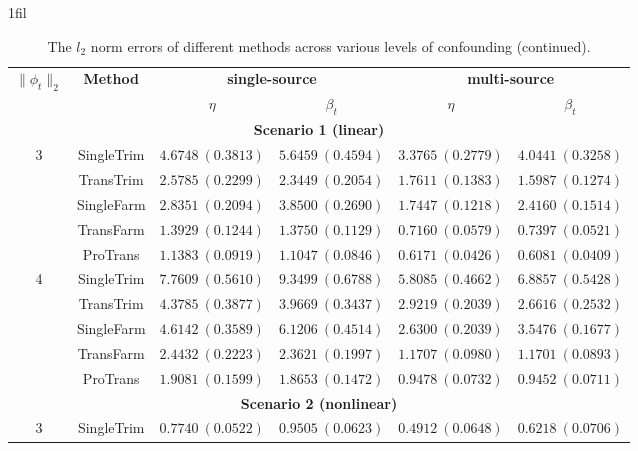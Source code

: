 \documentclass[12pt]{article}
\makeatletter
\newcommand*{\centerfloat}{%
  \parindent \z@
  \leftskip \z@ \@plus 1fil \@minus \marginparwidth
  \rightskip \leftskip
  \parfillskip \z@skip}
\makeatother
\begin{document}
\begin{table}[!ht]
\renewcommand{\arraystretch}{0.6}
\footnotesize
\centerfloat
\caption{The $l_2$ norm errors of different methods across various levels of confounding (continued).}
\label{tab:sup:l2_norm_phi(continued)}
    \begin{tabular}{cccccc}
        \toprule
        \multirow{2}{*}{$\|\phi_t\|_2$} & \multirow{2}{*}{\textbf{Method}} & \multicolumn{2}{c}{\textbf{single-source}} & \multicolumn{2}{c}{\textbf{multi-source}}\\
        \cmidrule(lr){3-4} \cmidrule(lr){5-6} 
        & & $\eta$ & $\beta_{t}$ & $\eta$& $\beta_{t}$ \\
        \midrule
        \multicolumn{6}{c}{\textbf{Scenario 1 (linear)}}\\
        \hline
        \multirow{5}{*}{3} 
        & SingleTrim  & $4.6748\ (0.3813)$ & $5.6459\ (0.4594)$ & $3.3765\ (0.2779)$ & $4.0441\ (0.3258)$ \\
        & TransTrim   & $2.5785\ (0.2299)$ & $2.3449\ (0.2054)$ & $1.7611\ (0.1383)$ & $1.5987\ (0.1274)$ \\
        & SingleFarm  & $2.8351\ (0.2094)$ & $3.8500\ (0.2690)$ & $1.7447\ (0.1218)$ & $2.4160\ (0.1514)$ \\
        & TransFarm   & $1.3929\ (0.1244)$ & $1.3750\ (0.1129)$ & $0.7160\ (0.0579)$ & $0.7397\ (0.0521)$ \\
        & ProTrans    & $\bm{1.1383}\ (0.0919)$ & $\bm{1.1047}\ (0.0846)$ & $\bm{0.6171}\ (0.0426)$ & $\bm{0.6081}\ (0.0409)$ \\
        \hline
        \multirow{5}{*}{4} 
        & SingleTrim  & $7.7609\ (0.5610)$ & $9.3499\ (0.6788)$ & $5.8085\ (0.4662)$ & $6.8857\ (0.5428)$ \\
        & TransTrim   & $4.3785\ (0.3877)$ & $3.9669\ (0.3437)$ & $2.9219\ (0.2039)$ & $2.6616\ (0.2532)$ \\
        & SingleFarm  & $4.6142\ (0.3589)$ & $6.1206\ (0.4514)$ & $2.6300\ (0.2039)$ & $3.5476\ (0.1677)$ \\
        & TransFarm   & $2.4432\ (0.2223)$ & $2.3621\ (0.1997)$ & $1.1707\ (0.0980)$ & $1.1701\ (0.0893)$ \\
        & ProTrans    & $\bm{1.9081}\ (0.1599)$ & $\bm{1.8653}\ (0.1472)$ & $\bm{0.9478}\ (0.0732)$ & $\bm{0.9452}\ (0.0711)$ \\
        \hline
         \multicolumn{6}{c}{\textbf{Scenario 2 (nonlinear)}}\\
         \hline
        \multirow{5}{*}{3} 
        & SingleTrim   & $0.7740\ (0.0522)$ & $0.9505\ (0.0623)$ & $0.4912\ (0.0648)$ & $0.6218\ (0.0706)$ \\

\end{tabular}
\end{table}
\end{document}

